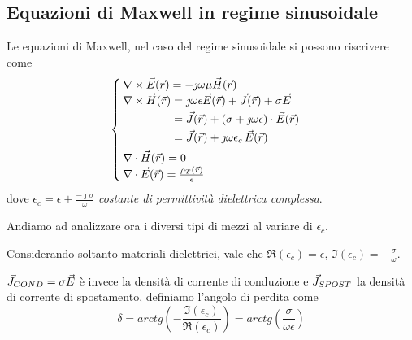 \subsection{Equazioni di Maxwell in regime sinusoidale}
Le equazioni di Maxwell, nel caso del regime sinusoidale si possono riscrivere come
\begin{equation}\begin{cases}
  \nabla\times\vec{E}(\vec{r}) = -\jmath \omega \mu\vec{H}(\vec{r}) \\
	\begin{aligned}[b]
		\nabla\times\vec{H}(\vec{r}) &= \jmath  \omega \epsilon \vec{E}(\vec{r}) + \vec{J}(\vec{r}) + \sigma\vec{E} \\
		&= \vec{J}(\vec{r}) +(\sigma + \jmath \omega \epsilon) \cdot \vec{E}(\vec{r}) \\
		&= \vec{J}(\vec{r}) +\jmath \omega \epsilon_c \, \vec{E}(\vec{r}) \\
	\end{aligned} \\
  \nabla\cdot\vec{H}(\vec{r})=0\\
  \nabla\cdot \vec{E}(\vec{r}) = \frac{\rho_T(\vec{r})}{\epsilon}
\end{cases}\end{equation}
dove $\epsilon_c = \epsilon + \frac{-\jmath\sigma}{\omega}$ \emph{costante di permittività dielettrica complessa}.

Andiamo ad analizzare ora i diversi tipi di mezzi al variare di $\epsilon_c$.

\begin{definition}
	Considerando soltanto materiali dielettrici, vale che $\Re(\epsilon_c) = \epsilon$, $\Im(\epsilon_c) = -\frac{\sigma}{\omega}$.

	$\vec{J}_{COND} = \sigma \vec{E}$ è invece la densità di corrente di conduzione e $\vec{J}_{SPOST}$ la densità di corrente di spostamento, definiamo l'angolo di perdita come
  \begin{equation}
    \delta = arctg\left(-\frac{\Im(\epsilon_c)}{\Re(\epsilon_c)}\right) = arctg\left(\frac{\sigma}{\omega \epsilon}\right)
    \end{equation}
\end{definition}

